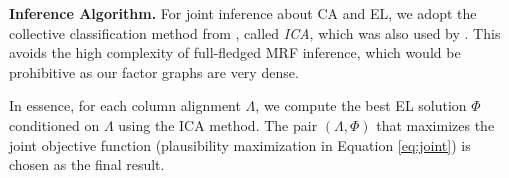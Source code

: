 % 



\vspace{0.1cm}
\noindent \textbf{Inference Algorithm.}
%
%
For joint inference about CA and EL, we adopt
the collective classification method from \cite{DBLP:conf/icml/LuG03},
called {\em ICA}, which was also used by
\cite{DBLP:conf/semweb/BhagavatulaND15}.
This avoids the high complexity of full-fledged
MRF inference, which would be prohibitive as
our factor graphs are very dense.

In essence, for each 
column alignment $\Lambda$, we compute the best EL solution $\Phi$
conditioned on $\Lambda$ using the ICA method. The pair $(\Lambda, \Phi)$ that maximizes the joint objective function (plausibility maximization in Equation \ref{eq:joint}) is chosen as the final result.

\begin{comment}

We implemented an algorithm to find the optimal entity assignment $\theta^*$ and column alignment $\mathcal{L}^*$ that maximize the plausibility value given
in Equation \ref{eq:plausibility}. 
Algorithm \ref{algor:1} shows the detail of our implementation. The main idea is that, for every $\mathcal{L}$, we find a corresponding $\theta'$ that maximizes $\textit{plausibility}(\mathcal{L} | \theta')$ (line 3). The pair $\mathcal{L}$ and $\theta'$ which best optimizes the objective function is chosen as the result.

For finding the optimal entity assignment $\theta'$ for a fixed column alignment $\mathcal{L}$, since doing a brute force over all possible entity assignments is time consuming, we adopt the Iterative Classification Algorithm
(ICA) \cite{DBLP:conf/icml/LuG03}, which is also used in \cite{DBLP:conf/semweb/BhagavatulaND15}, to collectively disambiguate all mentions.
We start with the entity assignment, which initializes each mention $m$ with the candidate entity $e$, which has the greatest prior probability $P(e|m)$ (line 8). Then, in each iteration, we compute a local best new candidate for each mention, conditioned on other mention entity values (line 11). 
We reassign these new values to mentions (line 13) and repeat the loop until there is no change.

\end{comment}

